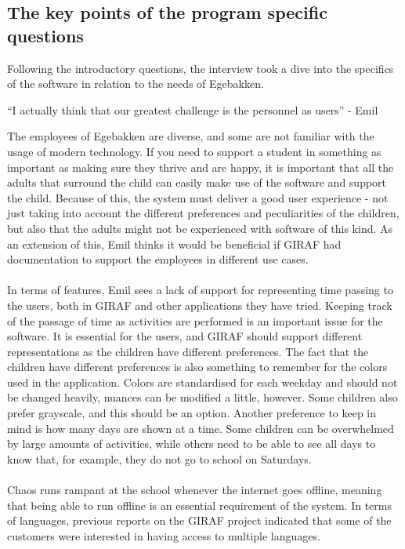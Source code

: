 \subsection{The key points of the program specific questions}
Following the introductory questions, the interview took a dive into the specifics of the software in relation to the needs of Egebakken.
\begin{displayquote}
    ``I actually think that our greatest challenge is the personnel as users''  - Emil
\end{displayquote}
The employees of Egebakken are diverse, and some are not familiar with the usage of modern technology.
If you need to support a student in something as important as making sure they thrive and are happy, it is important that all the adults that surround the child can easily make use of the software and support the child.
Because of this, the system must deliver a good user experience - not just taking into account the different preferences and peculiarities of the children, but also that the adults might not be experienced with software of this kind.
As an extension of this, Emil thinks it would be beneficial if GIRAF had documentation to support the employees in different use cases.
\\\\
In terms of features, Emil sees a lack of support for representing time passing to the users, both in GIRAF and other applications they have tried.
Keeping track of the passage of time as activities are performed is an important issue for the software.
It is essential for the users, and GIRAF should support different representations as the children have different preferences.
The fact that the children have different preferences is also something to remember for the colors used in the application.
Colors are standardised for each weekday and should not be changed heavily, nuances can be modified a little, however.
Some children also prefer grayscale, and this should be an option.
Another preference to keep in mind is how many days are shown at a time.
Some children can be overwhelmed by large amounts of activities, while others need to be able to see all days to know that, for example, they do not go to school on Saturdays.
\\\\
Chaos runs rampant at the school whenever the internet goes offline, meaning that being able to run offline is an essential requirement of the system.
In terms of languages, previous reports on the GIRAF project indicated that some of the customers were interested in having access to multiple languages.
